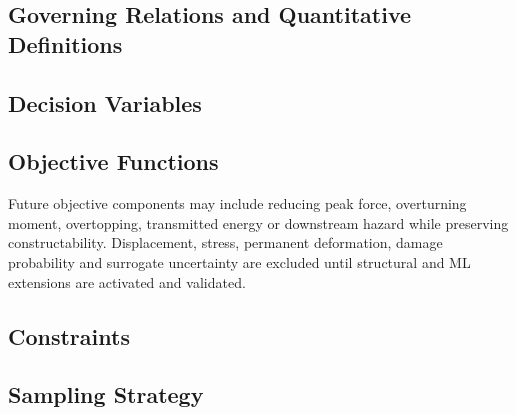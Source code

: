 %

\subsection{Governing Relations and Quantitative Definitions}
\label{sec:res-opt-obj-governing-relations}

%

\subsection{Decision Variables}
\label{sec:res-opt-obj-decision-variables}


\subsection{Objective Functions}
\label{sec:res-opt-obj-objective-functions}

Future objective components may include reducing peak force,
overturning moment, overtopping, transmitted energy or downstream
hazard while preserving constructability. Displacement, stress,
permanent deformation, damage probability and surrogate uncertainty
are excluded until structural and ML extensions are activated and
validated.

\subsection{Constraints}
\label{sec:res-opt-obj-constraints}


\subsection{Sampling Strategy}
\label{sec:res-opt-obj-sampling-strategy}

